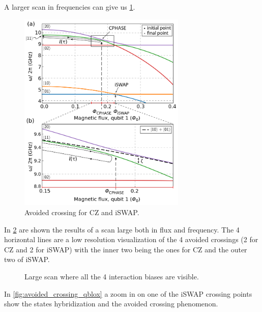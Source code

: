 A larger scan in frequencies can give us \cref{fig:avoided_crossing2}.
\begin{figure}[ht]
    \centering
    \includegraphics[width=8cm]{Two-qubits calibration/Figures/crossing_cz_iswap.png}
    \caption{Avoided crossing for CZ and iSWAP.}
    \label{fig:avoided_crossing2}
\end{figure}

In \cref{fig:crossings_large} are shown the results of a scan large both in flux and frequency.
The 4 horizontal lines are a low resolution visualization of the 4 avoided crossings (2 for CZ and 2 for iSWAP) with the inner two being the ones for CZ and the outer two of iSWAP.

\begin{figure}[ht]
    \centering
    \caption{Large scan where all the 4 interaction biases are visible.}
    \label{fig:crossings_large}
\end{figure}

In \cref{fig:avoided_crossing_qblox} a zoom in on one of the iSWAP crossing points show the states hybridization and the avoided crossing phenomenon.


